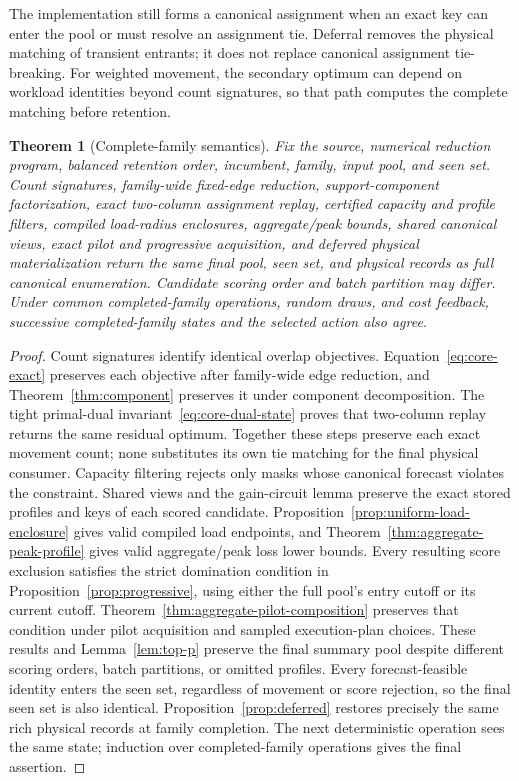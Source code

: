 \documentclass[11pt]{article}
\newtheorem{theorem}{Theorem}
\begin{document}
The implementation still forms a canonical assignment when an exact key can enter the pool or must resolve an assignment tie. Deferral removes the physical matching of transient entrants; it does not replace canonical assignment tie-breaking. For weighted movement, the secondary optimum can depend on workload identities beyond count signatures, so that path computes the complete matching before retention.

\begin{theorem}[Complete-family semantics]\label{thm:family-semantics}
Fix the source, numerical reduction program, balanced retention order, incumbent, family, input pool, and seen set. Count signatures, family-wide fixed-edge reduction, support-component factorization, exact two-column assignment replay, certified capacity and profile filters, compiled load-radius enclosures, aggregate/peak bounds, shared canonical views, exact pilot and progressive acquisition, and deferred physical materialization return the same final pool, seen set, and physical records as full canonical enumeration. Candidate scoring order and batch partition may differ. Under common completed-family operations, random draws, and cost feedback, successive completed-family states and the selected action also agree.
\end{theorem}
\begin{proof}
Count signatures identify identical overlap objectives. Equation~\eqref{eq:core-exact} preserves each objective after family-wide edge reduction, and Theorem~\ref{thm:component} preserves it under component decomposition. The tight primal-dual invariant~\eqref{eq:core-dual-state} proves that two-column replay returns the same residual optimum. Together these steps preserve each exact movement count; none substitutes its own tie matching for the final physical consumer. Capacity filtering rejects only masks whose canonical forecast violates the constraint. Shared views and the gain-circuit lemma preserve the exact stored profiles and keys of each scored candidate. Proposition~\ref{prop:uniform-load-enclosure} gives valid compiled load endpoints, and Theorem~\ref{thm:aggregate-peak-profile} gives valid aggregate/peak loss lower bounds. Every resulting score exclusion satisfies the strict domination condition in Proposition~\ref{prop:progressive}, using either the full pool's entry cutoff or its current cutoff. Theorem~\ref{thm:aggregate-pilot-composition} preserves that condition under pilot acquisition and sampled execution-plan choices. These results and Lemma~\ref{lem:top-p} preserve the final summary pool despite different scoring orders, batch partitions, or omitted profiles. Every forecast-feasible identity enters the seen set, regardless of movement or score rejection, so the final seen set is also identical. Proposition~\ref{prop:deferred} restores precisely the same rich physical records at family completion. The next deterministic operation sees the same state; induction over completed-family operations gives the final assertion.
\end{proof}
\end{document}
